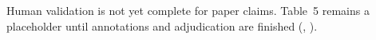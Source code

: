 Human validation is not yet complete for paper claims. Table~5 remains a placeholder until annotations and adjudication are finished (, ).
